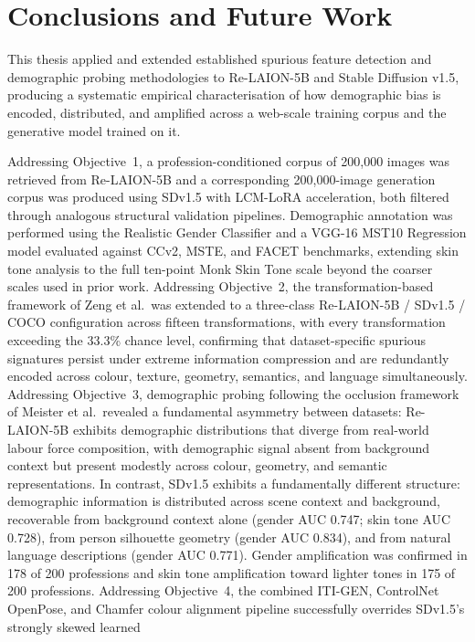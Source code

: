 \section{Conclusions and Future Work}

This thesis applied and extended established spurious feature detection and demographic
probing methodologies to Re-LAION-5B and Stable Diffusion v1.5, producing a systematic
empirical characterisation of how demographic bias is encoded, distributed, and amplified
across a web-scale training corpus and the generative model trained on it.

Addressing Objective~1, a profession-conditioned corpus of 200,000 images was retrieved
from Re-LAION-5B and a corresponding 200,000-image generation corpus was produced using
SDv1.5 with LCM-LoRA acceleration, both filtered through analogous structural validation
pipelines. Demographic annotation was performed using the Realistic Gender
Classifier and a VGG-16 MST10 Regression model evaluated against CCv2, MSTE, and FACET
benchmarks, extending skin tone analysis to the full ten-point Monk Skin Tone scale
beyond the coarser scales used in prior work. Addressing Objective~2, the
transformation-based framework of Zeng et al.\ was extended to a three-class
Re-LAION-5B / SDv1.5 / COCO configuration across fifteen transformations, with every
transformation exceeding the 33.3\% chance level, confirming that dataset-specific
spurious signatures persist under extreme information compression and are redundantly
encoded across colour, texture, geometry, semantics, and language simultaneously.
Addressing Objective~3, demographic probing following the occlusion framework of Meister
et al.\ revealed a fundamental asymmetry between datasets: Re-LAION-5B exhibits
demographic distributions that diverge from real-world labour force composition, with
demographic signal absent from background context but present modestly across colour,
geometry, and semantic representations. In contrast, SDv1.5 exhibits a fundamentally
different structure: demographic information is distributed across scene context and
background, recoverable from background context alone (gender AUC 0.747; skin tone AUC
0.728), from person silhouette geometry (gender AUC 0.834), and from natural language
descriptions (gender AUC 0.771). Gender amplification was confirmed in 178 of 200
professions and skin tone amplification toward lighter tones in 175 of 200
professions. Addressing Objective~4, the combined ITI-GEN, ControlNet OpenPose, and
Chamfer colour alignment pipeline successfully overrides SDv1.5's strongly skewed learned
